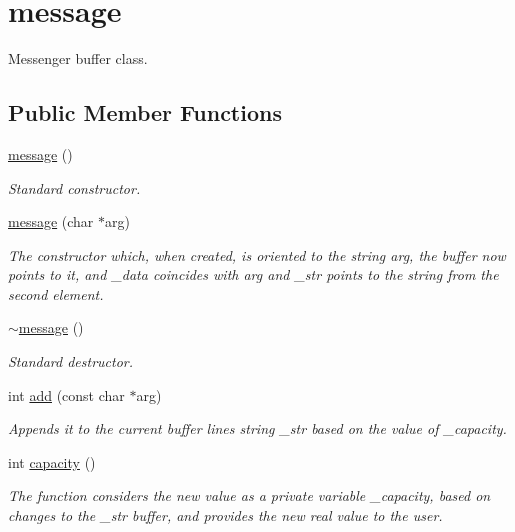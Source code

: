 \hypertarget{classmessage}{}\section{message}
\label{classmessage}


Messenger buffer class.  


\subsection*{Public Member Functions}
\begin{DoxyCompactItemize}
\item 
\hyperlink{classmessage_aba502b8bb024cc38b45756fdf581f915}{message} ()
\begin{DoxyCompactList}\small\item\em Standard constructor. \end{DoxyCompactList}\item 
\hyperlink{classmessage_a3ef1da0ca306b53a28c36153a06b0f7d}{message} (char $\ast$arg)
\begin{DoxyCompactList}\small\item\em The constructor which, when created, is oriented to the string arg, the buffer now points to it, and \+\_\+data coincides with arg and \+\_\+str points to the string from the second element. \end{DoxyCompactList}\item 
\hyperlink{classmessage_ad1e1d5c1974b1842edde5b261015cdde}{$\sim$message} ()
\begin{DoxyCompactList}\small\item\em Standard destructor. \end{DoxyCompactList}\item 
int \hyperlink{classmessage_a86ea56f1017e712e5b721013f1bdfb49}{add} (const char $\ast$arg)
\begin{DoxyCompactList}\small\item\em Appends it to the current buffer line\textquotesingle{}s string \+\_\+str based on the value of \+\_\+capacity. \end{DoxyCompactList}\item 
int \hyperlink{classmessage_ad7becd1f37b2db660d2335aec66075c8}{capacity} ()
\begin{DoxyCompactList}\small\item\em The function considers the new value as a private variable \+\_\+capacity, based on changes to the \+\_\+str buffer, and provides the new real value to the user. \end{DoxyCompactList}\item 

\end{DoxyCompactItemize}
